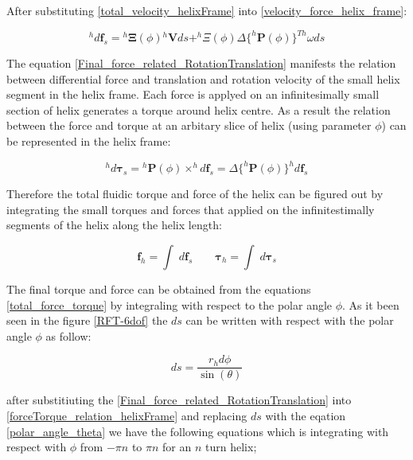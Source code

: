 \documentclass[12pt,a4paper,titlepage]{report}
\begin{document}
After substituting \ref{total_velocity_helixFrame} into \ref{velocity_force_helix_frame}:

\begin{equation}
 ^{h}d\bm{f}_s = {^{h}\bm{\Xi}}(\phi){^{h}\bm{V}}{ds} + ^{h}\Xi(\phi)\Delta{\{^{h}\bm{P}(\phi)}\}^{Th}\omega{ds}
\label{Final_force_related_RotationTranslation}
\end{equation}

The equation \ref{Final_force_related_RotationTranslation} manifests the relation between differential force
and translation and rotation velocity of the small helix segment in the helix frame. Each force is applyed on 
an infinitesimally small section of helix generates a torque around helix centre. As a result the 
relation between the force and torque at an arbitary slice of helix (using parameter $\phi$) can be 
represented in the helix frame:

\begin{equation}
 ^{h}d\bm{\tau}_s = {^{h}\bm{P}(\phi)} \times ^{h}d\bm{f}_s=\Delta{\{^{h}\bm{P}(\phi)}\}^{h}{d\bm{f}_s}
\label{forceTorque_relation_helixFrame}
\end{equation}

Therefore the total fluidic torque and force of the helix can be figured out by integrating the small torques
and forces that applied on the infinitestimally segments of the helix along the helix length:

\begin{equation}
 \bm{f}_h = \int \; d\bm{f}_s  \qquad  \bm{\tau}_h = \int \; d\bm{\tau}_s 
\label{total_force_torque}
\end{equation} 
 
The final torque and force can be obtained from the equations \ref{total_force_torque} by 
integraling with respect to the polar angle $\phi$. As it been seen in the figure \ref{RFT-6dof} the $ds$
can be written with respect with the polar angle $\phi$ as follow:


\begin{equation}
ds = \frac{r_hd\phi}{\sin(\theta)}
\label{polar_angle_theta}
\end{equation} 

after substitiuting the \ref{Final_force_related_RotationTranslation} into \ref{forceTorque_relation_helixFrame} and 
replacing $ds$ with the eqation \ref{polar_angle_theta} we have the following equations which is 
integrating with respect with $\phi$ from $-\pi n$ to $\pi n$ for an $n$ turn helix;
\end{document}
